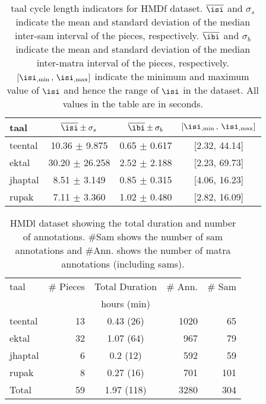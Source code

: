 \begin{table}[t]
\begin{center}
\begin{tabular}{@{}lccc@{}}
\toprule 
\Gls{taal} & $\overline{\isi} \pm \sigma_s$ & $\overline{\ibi} \pm \sigma_b$  & $[{\isi}_{,\min} \, , \,  {\isi}_{,\max} ]$ \tabularnewline
\midrule 
\Gls{teental} & 10.36 $\pm$ 9.875 & 0.65 $\pm$ 0.617 & {[}2.32, 44.14{]}\tabularnewline
\Gls{ektal} & 30.20 $\pm$ 26.258 & 2.52 $\pm$ 2.188 & {[}2.23, 69.73{]}\tabularnewline
\Gls{jhaptal} & 8.51 $\pm$ 3.149 & 0.85 $\pm$ 0.315 & {[}4.06, 16.23{]}\tabularnewline
\Gls{rupak} & 7.11 $\pm$ 3.360 & 1.02 $\pm$ 0.480 & {[}2.82, 16.09{]}\tabularnewline
\bottomrule 
\end{tabular}
\end{center}
\protect\caption[\Gls{taal} cycle length indicators for \acrshort{HMDf} dataset]{\Gls{taal} cycle length indicators for \acrshort{HMDf} dataset. $\overline{\isi}$ and $\sigma_s$ indicate the mean and standard deviation of the median inter-\gls{sam} interval of the pieces, respectively. $\overline{\ibi}$ and $\sigma_b$ indicate the mean and standard deviation of the median inter-\gls{matra} interval of the pieces, respectively. $[{\isi}_{,\min} \, , \,  {\isi}_{,\max}]$ indicate the minimum and maximum value of $\isi$ and hence the range of $\isi$ in the dataset. All values in the table are in seconds.}
\label{tab:datastat:hmdf}
\end{table}
\begin{table}[t]
\begin{center}
\begin{tabular}{@{}lrcrr@{}}
\toprule 
\Gls{taal} & \# Pieces & Total Duration & \# Ann. & \# Sam\tabularnewline
 &  & hours (min) &  & \tabularnewline
\midrule 
\Gls{teental} & 13 & 0.43 (26) & 1020 & 65\tabularnewline
\Gls{ektal} & 32 & 1.07 (64) & 967 & 79\tabularnewline
\Gls{jhaptal} & 6 & 0.2 (12) & 592 & 59\tabularnewline
\Gls{rupak} & 8 & 0.27 (16) & 701 & 101\tabularnewline
\midrule 
Total & 59 & 1.97 (118) & 3280 & 304\tabularnewline
\bottomrule 
\end{tabular}
\end{center}
\protect\caption[\acrshort{HMDl} dataset description]{\acrshort{HMDl} dataset showing the total duration and number of annotations. \#Sam shows the number of \gls{sam} annotations and \#Ann. shows the number of \gls{matra} annotations (including \glspl{sam}).}
\label{tab:dataset:hmdl}
\end{table}
